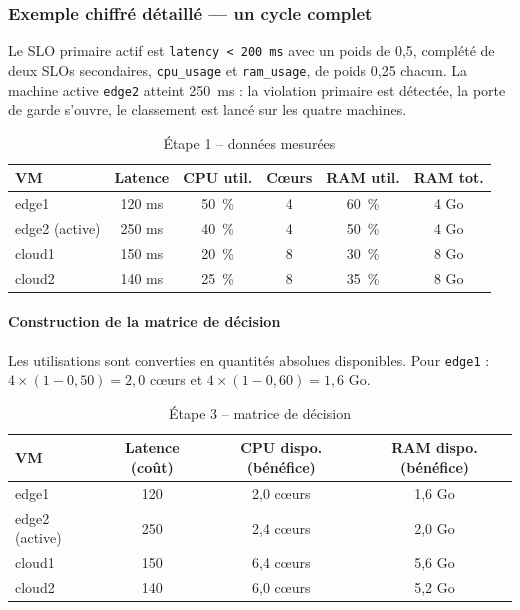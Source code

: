 \subsubsection{Exemple chiffré détaillé — un cycle complet}

Le SLO primaire actif est \texttt{latency < 200~ms} avec un poids de 0,5, complété de deux SLOs secondaires, \texttt{cpu\_usage} et \texttt{ram\_usage}, de poids 0,25 chacun. La machine active \texttt{edge2} atteint 250~ms : la violation primaire est détectée, la porte de garde s'ouvre, le classement est lancé sur les quatre machines.

\begin{table}[H]
    \centering
    \begin{tabular}{|l|c|c|c|c|c|}
        \hline
        \textbf{VM} & \textbf{Latence} & \textbf{CPU util.} & \textbf{C\oe{}urs} & \textbf{RAM util.} & \textbf{RAM tot.} \\
        \hline
        edge1 & 120 ms & 50~\% & 4 & 60~\% & 4 Go \\
        \hline
        edge2 (active) & 250 ms & 40~\% & 4 & 50~\% & 4 Go \\
        \hline
        cloud1 & 150 ms & 20~\% & 8 & 30~\% & 8 Go \\
        \hline
        cloud2 & 140 ms & 25~\% & 8 & 35~\% & 8 Go \\
        \hline
    \end{tabular}
    \caption{Étape 1 -- données mesurées}
    \label{tab:topsis-etape1}
\end{table}

\paragraph{Construction de la matrice de décision}

Les utilisations sont converties en quantités absolues disponibles. Pour \texttt{edge1} : $4 \times (1 - 0{,}50) = 2{,}0$ c\oe{}urs et $4 \times (1 - 0{,}60) = 1{,}6$ Go.

\begin{table}[H]
    \centering
    \begin{tabular}{|l|c|c|c|}
        \hline
        \textbf{VM} & \textbf{Latence (coût)} & \textbf{CPU dispo. (bénéfice)} & \textbf{RAM dispo. (bénéfice)} \\
        \hline
        edge1 & 120 & 2,0 c\oe{}urs & 1,6 Go \\
        \hline
        edge2 (active) & 250 & 2,4 c\oe{}urs & 2,0 Go \\
        \hline
        cloud1 & 150 & 6,4 c\oe{}urs & 5,6 Go \\
        \hline
        cloud2 & 140 & 6,0 c\oe{}urs & 5,2 Go \\
        \hline
    \end{tabular}
    \caption{Étape 3 -- matrice de décision}
    \label{tab:topsis-etape3}
\end{table}


